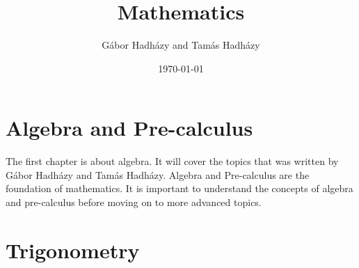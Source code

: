 \documentclass[a4paper,12pt]{book}
\author{Gábor Hadházy and Tamás Hadházy}
\title{Mathematics}
\date{\today}
\begin{document}
\maketitle

\tableofcontents

\chapter{Algebra and Pre-calculus}
The first chapter is about algebra. It will cover the topics that was written by Gábor Hadházy and Tamás Hadházy. Algebra and Pre-calculus are the foundation of mathematics. It is important to understand the concepts of algebra and pre-calculus before moving on to more advanced topics.


\chapter{Trigonometry}
\end{document}
